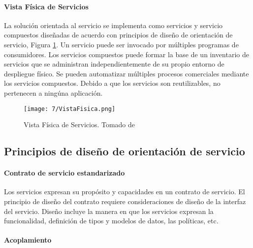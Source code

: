  \paragraph{Vista F\'isica  de Servicios}
  
   La solución orientada al servicio se implementa como servicios y servicio compuestos diseñadas de acuerdo con principios de diseño de orientación de servicio, Figura \ref{fig:vista-fisic}.
   Un servicio puede ser invocado por múltiples programas de consumidores. 
  	Los servicios compuestos puede formar la base de un inventario de servicios que se administran independientemente de su propio entorno de despliegue físico.
	Se pueden automatizar múltiples procesos comerciales mediante los servicios compuestos.
   	Debido a que los servicios son reutilizables, no pertenecen a ningúna aplicación.
 
    \begin{figure}%
    		\centering
  	\texttt{[image: 7/VistaFisica.png]}
  	\caption{Vista F\'isica  de Servicios. Tomado de \cite{Erl2007}}
  	\label{fig:vista-fisic}
  \end{figure}
  
   
    \subsection{Principios de diseño de orientación de servicio}
   \paragraph{Contrato de servicio estandarizado}
   	 
   	
   	Los servicios expresan su propósito y capacidades en un contrato de servicio.  El principio de diseño del contrato requiere  consideraciones de diseño de la interfaz del servicio.
   	Diseño incluye la manera en que los servicios expresan la funcionalidad, definición de tipos y modelos de datos, las políticas, etc.  

   		
   		

 \paragraph{Acoplamiento }
   
